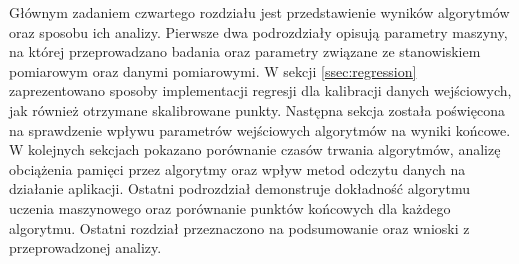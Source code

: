 Głównym zadaniem czwartego rozdziału jest przedstawienie wyników algorytmów oraz sposobu ich analizy. Pierwsze dwa podrozdziały opisują parametry maszyny, na której przeprowadzano badania oraz parametry związane ze stanowiskiem pomiarowym oraz danymi pomiarowymi. W sekcji \ref{ssec:regression} zaprezentowano sposoby implementacji regresji dla kalibracji danych wejściowych, jak również otrzymane skalibrowane punkty. Następna sekcja została poświęcona na sprawdzenie wpływu parametrów wejściowych algorytmów na wyniki końcowe. W kolejnych sekcjach pokazano porównanie czasów trwania algorytmów, analizę obciążenia pamięci przez algorytmy oraz wpływ metod odczytu danych na działanie aplikacji. Ostatni podrozdział demonstruje dokładność algorytmu uczenia maszynowego oraz porównanie punktów końcowych dla każdego algorytmu. Ostatni rozdział przeznaczono na podsumowanie oraz wnioski z przeprowadzonej analizy.